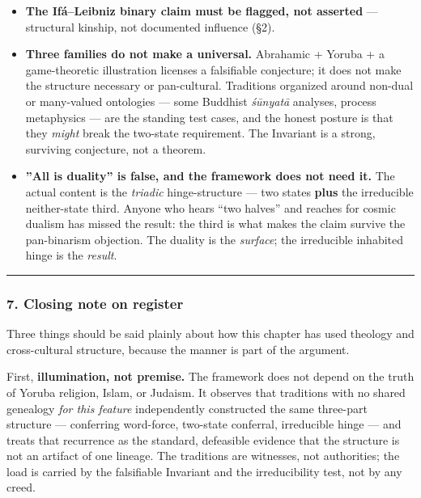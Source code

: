 \documentclass[11pt]{article}
\begin{document}
\begin{itemize}
\item \textbf{The Ifá–Leibniz binary claim must be flagged, not asserted} — structural kinship, not documented influence (§2).
\item \textbf{Three families do not make a universal.} Abrahamic + Yoruba + a game-theoretic illustration licenses a falsifiable conjecture; it does not make the structure necessary or pan-cultural. Traditions organized around non-dual or many-valued ontologies — some Buddhist \emph{śūnyatā} analyses, process metaphysics — are the standing test cases, and the honest posture is that they \emph{might} break the two-state requirement. The Invariant is a strong, surviving conjecture, not a theorem.
\item \textbf{''All is duality'' is false, and the framework does not need it.} The actual content is the \emph{triadic} hinge-structure — two states \textbf{plus} the irreducible neither-state third. Anyone who hears ``two halves'' and reaches for cosmic dualism has missed the result: the third is what makes the claim survive the pan-binarism objection. The duality is the \emph{surface}; the irreducible inhabited hinge is the \emph{result}.
\end{itemize}

\medskip\noindent\rule{\linewidth}{0.3pt}\medskip

\subsubsection*{7. Closing note on register}

Three things should be said plainly about how this chapter has used theology and cross-cultural structure, because the manner is part of the argument.

First, \textbf{illumination, not premise.} The framework does not depend on the truth of Yoruba religion, Islam, or Judaism. It observes that traditions with no shared genealogy \emph{for this feature} independently constructed the same three-part structure — conferring word-force, two-state conferral, irreducible hinge — and treats that recurrence as the standard, defeasible evidence that the structure is not an artifact of one lineage. The traditions are witnesses, not authorities; the load is carried by the falsifiable Invariant and the irreducibility test, not by any creed.
\end{document}
